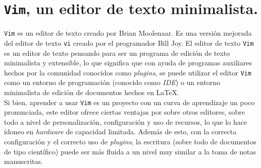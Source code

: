 \documentclass[10pt]{article}
\begin{document}
\maketitle

\section{\texttt{Vim}, un editor de texto minimalista.}
\texttt{Vim} es un editor de texto creado por Brian Moolenaar. Es una versión mejorada del editor de texto \texttt{vi} creado por el programador Bill Joy. 
El editor de texto \texttt{Vim} es un editor de texto pensando para ser un programa de edición de texto minimalista y extensible, lo que significa que con ayuda de programas auxiliares hechos por la comunidad conocidos como \textit{plugins}, se puede utilizar el editor \texttt{Vim} como un entorno de programación (conocido como \textit{IDE}) o un entorno minimalista de edición de documentos hechos en \LaTeX. \\ 
Si bien, aprender a usar \texttt{Vim} es un proyecto con un curva de aprendizaje un poco pronunciada, este editor ofrece ciertas ventajas por sobre otros editores, sobre todo a nivel de personalización, configuración y uso de recursos, lo que lo hace ídoneo en \textit{hardware} de capacidad limitada. 
Además de esto, con la correcta configuración y el correcto uso de \textit{plugins}, la escritura (sobre todo de documentos de tipo científico) puede ser más fluida a un nivel muy similar a la toma de notas manuscritas. 
\end{document}
